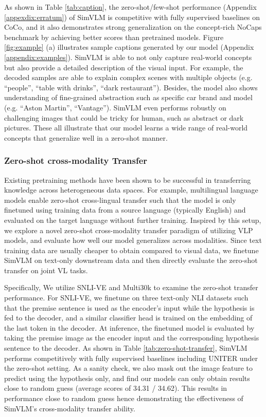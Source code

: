 \documentclass{article} \usepackage{iclr2022_conference,times}
\newcommand{\ours}{SimVLM}
\begin{document}
As shown in Table \ref{tab:caption},
the zero-shot/few-shot performance (Appendix \ref{appexdix:erratum}) of {\ours} is competitive with fully supervised baselines on CoCo,
and it also demonstrates strong generalization on the concept-rich NoCaps benchmark by achieving better scores than pretrained models.
Figure \ref{fig:example} (a) illustrates sample captions generated by our model (Appendix \ref{appendix:examples}). {\ours} is able to not only capture real-world concepts but also provide a detailed description of the visual input.
For example, the decoded samples are able to explain complex scenes with multiple objects (e.g. ``people'', ``table with drinks'', ``dark restaurant''). Besides, the model also shows understanding of fine-grained abstraction such as specific car brand and model (e.g. ``Aston Martin'', ``Vantage''). {\ours} even performs robustly on challenging images that could be tricky for human, such as abstract or dark pictures.
These all illustrate that our model learns a wide range of real-world concepts that generalize well in a zero-shot manner.

\subsubsection{Zero-shot cross-modality Transfer}

Existing pretraining methods have been shown to be successful in transferring knowledge across heterogeneous data spaces. For example, multilingual language models \citep{devlin2018bert,lample2019cross} enable zero-shot cross-lingual transfer such that the model is only finetuned using training data from a source language (typically English) and evaluated on the target language without further training. Inspired by this setup, we explore a novel zero-shot cross-modality transfer paradigm of utilizing VLP models, and evaluate how well our model generalizes across modalities. Since text training data are usually cheaper to obtain compared to visual data, we finetune {\ours} on text-only downstream data and then directly evaluate the zero-shot transfer on joint VL tasks.

Specifically, We utilize SNLI-VE and Multi30k to examine the zero-shot transfer performance. For SNLI-VE, we finetune on three text-only NLI datasets such that the premise sentence is used as the encoder's input while the hypothesis is fed to the decoder, and a similar classifier head is trained on the embedding of the last token in the decoder. At inference, the finetuned model is evaluated by taking the premise image as the encoder input and the corresponding hypothesis sentence to the decoder.
As shown in Table \ref{tab:zero-shot-transfer}, {\ours} performs competitively with fully supervised baselines including UNITER under the zero-shot setting.
As a sanity check, we also mask out the image feature to predict using the hypothesis only,
and find our models can only obtain results close to random guess (average scores of 34.31 / 34.62). 
This results in performance close to random guess hence demonstrating the effectiveness of {\ours}'s cross-modality transfer ability.
\end{document}
